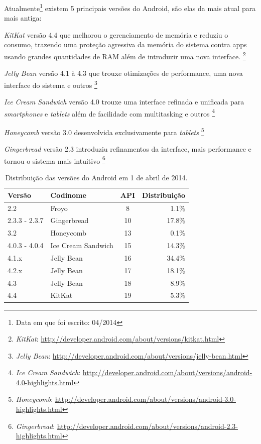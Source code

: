 \documentclass[a4paper,12pt,brazil,oneside]{book}
\begin{document}
Atualmente\footnote{Data em que foi escrito: 04/2014} existem 5 principais versões do Android, são elas da mais atual para mais antiga:
\bi
\item \emph{KitKat} versão 4.4 que melhorou o gerenciamento de memória e reduziu o consumo, trazendo uma proteção agressiva da memória do sistema contra apps usando grandes quantidades de RAM além de introduzir uma nova interface.
\footnote{\emph{KitKat}: \href{http://developer.android.com/about/versions/kitkat.html}{http://developer.android.com/about/versions/kitkat.html}}
\item \emph{Jelly Bean} versão 4.1 à 4.3 que trouxe otimizações de performance, uma nova interface do sistema e outros
\footnote{\emph{Jelly Bean}: \href{http://developer.android.com/about/versions/jelly-bean.html}{http://developer.android.com/about/versions/jelly-bean.html}}
\item \emph{Ice Cream Sandwich} versão 4.0 trouxe uma interface refinada e unificada para \emph{smartphones} e \emph{tablets} além de facilidade com multitasking e outros
\footnote{\emph{Ice Cream Sandwich}: \href{http://developer.android.com/about/versions/android-4.0-highlights.html}{http://developer.android.com/about/versions/android-4.0-highlights.html}}
\item \emph{Honeycomb} versão 3.0 desenvolvida exclusivamente para \emph{tablets}
\footnote{\emph{Honeycomb}: \href{http://developer.android.com/about/versions/android-3.0-highlights.html}{http://developer.android.com/about/versions/android-3.0-highlights.html}}
\item \emph{Gingerbread} versão 2.3 introduziu refinamentos da interface, mais performance e tornou o sistema mais intuitivo
\footnote{\emph{Gingerbread}: \href{http://developer.android.com/about/versions/android-2.3-highlights.html}{http://developer.android.com/about/versions/android-2.3-highlights.html}}
\ei

\begin{table}[htb!]
  \centering
    \begin{tabular}{llcr}
     \rowcolor{Gray} \hline 
    Versão        & Codinome           & API & Distribuição \\ \hline \hline
    2.2           & Froyo              & 8   & 1.1\%        \\ 
    2.3.3 - 2.3.7 & Gingerbread        & 10  & 17.8\%       \\ 
    3.2           & Honeycomb          & 13  & 0.1\%        \\ 
    4.0.3 - 4.0.4 & Ice Cream Sandwich & 15  & 14.3\%       \\ 
    4.1.x         & Jelly Bean         & 16  & 34.4\%       \\ 
    4.2.x         & Jelly Bean         & 17  & 18.1\%        \\
    4.3         & Jelly Bean         & 18  & 8.9\%        \\ 
    4.4         & KitKat        & 19  & 5.3\%        \\ \hline
    \end{tabular}
    \caption{Distribuição das versões do Android em 1 de abril de 2014.}
     \label{tab:distribuicaoAndroid}
\end{table}
\end{document}
